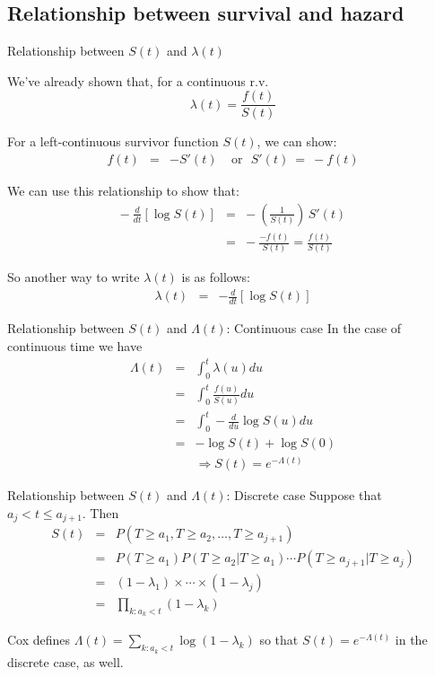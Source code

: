 \documentclass[envcountsect, 10pt, portrait, palatino]{beamer}
\begin{document}
\subsection{Relationship between survival and hazard}
\begin{frame}{Relationship between $S(t)$ and $\lambda(t)$}

We've already shown that, for a continuous r.v.
$$\lambda(t)=\frac{f(t)}{S(t)}$$

For a left-continuous survivor function $S(t)$, we can show:
\begin{eqnarray*}
f(t) & = & - S'(t) ~~~~~\mbox{or}~~~ S'(t) ~ = ~ -f(t)
\end{eqnarray*}

We can use this relationship to show that:
\begin{eqnarray*}
- ~ \frac{d}{dt} [\log S(t)] & = &
- ~ \left(\frac{1}{S(t)}\right)\, S'(t)\\[1ex]
& = & - ~\frac{-f(t)}{S(t)} =  \frac{f(t)}{S(t)}
\end{eqnarray*}

So another way to write $\lambda(t)$ is as follows:
\begin{eqnarray*}
\lambda(t) & = & - \frac{d}{dt} [\log S(t)]
\end{eqnarray*}
\end{frame}
\begin{frame}{Relationship between $S(t)$ and $\Lambda(t)$: Continuous case}
In the case of continuous time we have
\begin{eqnarray*}
\Lambda(t) & = & \int_0^t \lambda(u)du \\[1.5ex]
& = &  \int_0^t\frac{f(u)}{S(u)}du \\[1.5ex]
& = & \int_0^t -\frac{d}{du} \log S(u) du \\[1.5ex]
& = & -\log S(t)+\log S(0)\\[2ex]
& & \Rightarrow S(t)=e^{-\Lambda(t)}
\end{eqnarray*}
\end{frame}
\begin{frame}{Relationship between $S(t)$ and $\Lambda(t)$: Discrete case} 
Suppose that $a_j<t\le a_{j+1}$.  Then
\begin{eqnarray*}
S(t) & = & P(T\ge a_1, T\ge a_2, \ldots, T\ge a_{j+1}) \\[1ex]
& = & P(T\ge a_1)P(T\ge a_2|T\ge a_1) \cdots
P(T\ge a_{j+1}|T\ge a_j)\\[1ex]
& = & (1-\lambda_1)\times \cdots \times (1-\lambda_j)\\[1ex]
& = & \prod_{k:a_k<t}(1-\lambda_k)
\end{eqnarray*}

Cox defines $\Lambda(t)=\sum_{k:a_k<t}\log(1-\lambda_k)$ so that
$S(t)=e^{-\Lambda(t)}$ in the discrete case, as well.
\end{frame}
\end{document}
